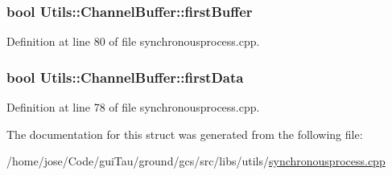 \hypertarget{struct_utils_1_1_channel_buffer_ac695882231416a6a43841faf53242fbc}{
\subsubsection[{first\-Buffer}]{\setlength{\rightskip}{0pt plus 5cm}bool Utils\-::\-Channel\-Buffer\-::first\-Buffer}}\label{struct_utils_1_1_channel_buffer_ac695882231416a6a43841faf53242fbc}


Definition at line 80 of file synchronousprocess.\-cpp.

\hypertarget{struct_utils_1_1_channel_buffer_acb0128e17057f24d11abcb41acfd2da4}{
\subsubsection[{first\-Data}]{\setlength{\rightskip}{0pt plus 5cm}bool Utils\-::\-Channel\-Buffer\-::first\-Data}}\label{struct_utils_1_1_channel_buffer_acb0128e17057f24d11abcb41acfd2da4}


Definition at line 78 of file synchronousprocess.\-cpp.



The documentation for this struct was generated from the following file\-:\begin{DoxyCompactItemize}
\item 
/home/jose/\-Code/gui\-Tau/ground/gcs/src/libs/utils/\hyperlink{synchronousprocess_8cpp}{synchronousprocess.\-cpp}\end{DoxyCompactItemize}
